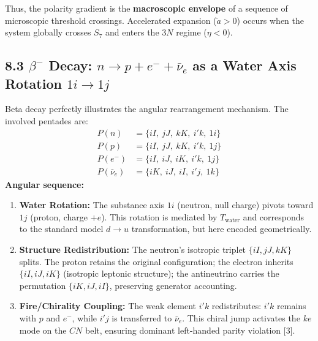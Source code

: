\documentclass[11pt]{article}
\providecommand{\tightlist}{\setlength{\itemsep}{2pt}\setlength{\parskip}{6pt}}
\providecommand{\tightlist}{%
  \setlength{\itemsep}{2pt}\setlength{\parskip}{6pt}
}
\begin{document}
Thus, the polarity gradient is the \textbf{macroscopic envelope} of a
sequence of microscopic threshold crossings. Accelerated expansion
(\(\ddot{a} > 0\)) occurs when the system globally crosses \(S_7\) and
enters the \(3N\) regime (\(\eta < 0\)).

\hypertarget{beta--decay-n-to-p-e--barnu_e-as-a-water-axis-rotation-1i-to-1j}{%
\subsection{\texorpdfstring{8.3 \(\beta^-\) Decay:
\(n \to p + e^- + \bar{\nu}_e\) as a Water Axis Rotation
\(1i \to 1j\)}{8.3 \textbackslash beta\^{}- Decay: n \textbackslash to p + e\^{}- + \textbackslash bar\{\textbackslash nu\}\_e as a Water Axis Rotation 1i \textbackslash to 1j}}\label{beta--decay-n-to-p-e--barnu_e-as-a-water-axis-rotation-1i-to-1j}}

Beta decay perfectly illustrates the angular rearrangement mechanism.
The involved pentades are: \[
\begin{aligned}
P(n) &= \{iI,\ jJ,\ kK,\ i'k,\ 1i\} \\
P(p) &= \{iI,\ jJ,\ kK,\ i'k,\ 1j\} \\
P(e^-) &= \{iI,\ iJ,\ iK,\ i'k,\ 1j\} \\
P(\bar{\nu}_e) &= \{iK,\ iJ,\ iI,\ i'j,\ 1k\}
\end{aligned}
\] \textbf{Angular sequence:}

\begin{enumerate}
\def\labelenumi{\arabic{enumi}.}
\tightlist
\item
  \textbf{Water Rotation:} The substance axis \(1i\) (neutron, null
  charge) pivots toward \(1j\) (proton, charge \(+e\)). This rotation is
  mediated by \(T_{\text{water}}\) and corresponds to the standard model
  \(d \to u\) transformation, but here encoded geometrically.
\item
  \textbf{Structure Redistribution:} The neutron's isotropic triplet
  \(\{iI, jJ, kK\}\) splits. The proton retains the original
  configuration; the electron inherits \(\{iI, iJ, iK\}\) (isotropic
  leptonic structure); the antineutrino carries the permutation
  \(\{iK, iJ, iI\}\), preserving generator accounting.
\item
  \textbf{Fire/Chirality Coupling:} The weak element \(i'k\)
  redistributes: \(i'k\) remains with \(p\) and \(e^-\), while \(i'j\)
  is transferred to \(\bar{\nu}_e\). This chiral jump activates the
  \textit{ke} mode on the \(CN\) belt, ensuring dominant left-handed
  parity violation {[}3{]}.
\end{enumerate}
\end{document}
